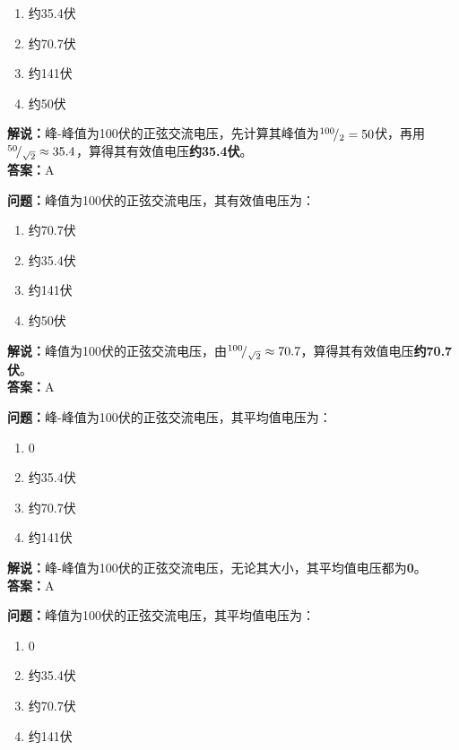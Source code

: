 \begin{enumerate}[label=\Alph*), leftmargin=1cm]
	\item 约35.4伏
	\item 约70.7伏
	\item 约141伏
	\item 约50伏
\end{enumerate}

\textbf{解说：}峰-峰值为100伏的正弦交流电压，先计算其峰值为\({}^{100}\!/_{2}=50\)伏，再用\({}^{50}\!/_{\sqrt{2}}\approx35.4\)，算得其有效值电压\textbf{约35.4伏}。\\\textbf{答案：}A%



\textbf{问题：}峰值为100伏的正弦交流电压，其有效值电压为：

\begin{enumerate}[label=\Alph*), leftmargin=1cm]
	\item 约70.7伏
	\item 约35.4伏
	\item 约141伏
	\item 约50伏
\end{enumerate}

\textbf{解说：}峰值为100伏的正弦交流电压，由\({}^{100}\!/_{\sqrt{2}}\approx70.7\)，算得其有效值电压\textbf{约70.7伏}。\\\textbf{答案：}A



\textbf{问题：}峰-峰值为100伏的正弦交流电压，其平均值电压为：

\begin{enumerate}[label=\Alph*), leftmargin=1cm]
	\item 0
	\item 约35.4伏
	\item 约70.7伏
	\item 约141伏
\end{enumerate}

\textbf{解说：}峰-峰值为100伏的正弦交流电压，无论其大小，其平均值电压都为\textbf{0}。\\\textbf{答案：}A



\textbf{问题：}峰值为100伏的正弦交流电压，其平均值电压为：

\begin{enumerate}[label=\Alph*), leftmargin=1cm]
	\item 0
	\item 约35.4伏
	\item 约70.7伏
	\item 约141伏
\end{enumerate}

